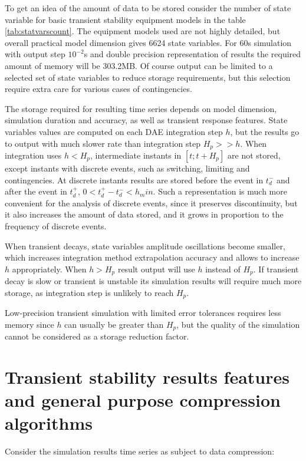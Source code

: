 \documentclass[lettersize,journal]{IEEEtran}
\begin{document}
To get an idea of the amount of data to be stored consider the number of state variable for basic transient 
stability equipment models in the table \ref{tab:statvarscount}. The equipment models used are not 
highly detailed, but overall practical model dimension gives 6624 state variables. For 60s simulation with
output step \(10^{-2}\)s and double precision representation of results the required amount of memory will be 303.2MB.
Of course output can be limited to a selected set of state variables to reduce storage requirements,
but this selection require extra care for various cases of contingencies.

The storage required for resulting time series depends on model dimension, simulation duration
and accuracy, as well as transient response features. State variables values are computed on each DAE integration
step \(h\), but the results go to output with much slower rate than integration step \(H_p>>h\). 
When integration uses \(h<H_p\), intermediate instants in \([t;t+H_p]\) are not stored, except
instants with discrete events, such as switching, limiting and contingencies. At discrete instants
results are stored before the event in \(t_d^-\) and after the event in \(t_d^+\), \(0<t_d^+-t_d^-<h_min\).
Such a representation is much more convenient for the analysis of discrete events, since it preserves
discontinuity, but it also increases the amount of data stored, and it grows in proportion to the 
frequency of discrete events.

When transient decays, state variables amplitude oscillations become smaller, which increases
integration method extrapolation accuracy and allows to increase \(h\) appropriately.
When \(h>H_p\) result output will use \(h\) instead of \(H_p\). If transient decay is slow or
transient is unstable its simulation results will require much more storage, as integration
step is unlikely to reach \(H_p\). 

Low-precision transient simulation with limited error tolerances requires less memory since \(h\) can usually be
greater than \(H_p\), but the quality of the simulation cannot be considered as a storage reduction factor.

\section{Transient stability results features and general purpose compression algorithms}
Consider the simulation results time series as subject to data compression:
\end{document}
